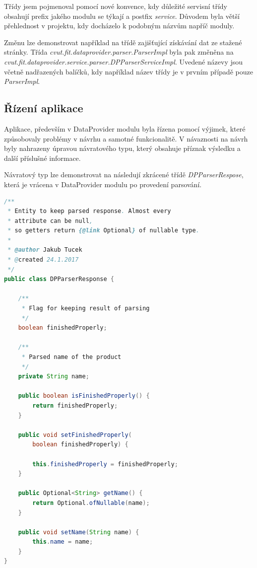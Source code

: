 \documentclass[thesis=B,czech]{FITthesis}[2012/06/26]
\begin{document}
Třídy jsem pojmenoval pomocí nové konvence, kdy důležité servisní třídy obsahují prefix jakého modulu se týkají
a postfix \textit{service}. Důvodem byla větší přehlednost v projektu, kdy docházelo k podobným názvům napříč moduly.
\par
Změnu lze demonstrovat například na třídě zajišťující získávání dat ze stažené stránky. Třída \textit{cvut.fit.dataprovider.parser.ParserImpl} byla pak změněna na \textit{cvut.fit.dataprovider.service.parser.DPParserServiceImpl}. Uvedené názevy jsou včetně 
nadřazených balíčků, kdy například název třídy je v prvním případě pouze \textit{ParserImpl}.

\subsection{Řízení aplikace}
Aplikace, především v DataProvider modulu byla řízena pomocí výjimek, které způsobovaly problémy v návrhu a samotné funkcionalitě.
V návaznosti na návrh byly nahrazeny úpravou návratového typu, který obsahuje příznak výsledku 
a další příslušné informace.
\par
Návratový typ lze demonstrovat na následují zkrácené třídě \textit{DPParserRespose}, která je vrácena v DataProvider modulu
po provedení parsování.

\begin{lstlisting}[language=Java]
/**
 * Entity to keep parsed response. Almost every 
 * attribute can be null, 
 * so getters return {@link Optional} of nullable type.
 *
 * @author Jakub Tucek
 * @created 24.1.2017
 */
public class DPParserResponse {

    /**
     * Flag for keeping result of parsing
     */
    boolean finishedProperly;

    /**
     * Parsed name of the product
     */
    private String name;

    public boolean isFinishedProperly() {
        return finishedProperly;
    }

    public void setFinishedProperly(
    	boolean finishedProperly) {
    	
        this.finishedProperly = finishedProperly;
    }

    public Optional<String> getName() {
        return Optional.ofNullable(name);
    }

    public void setName(String name) {
        this.name = name;
    }
}
\end{lstlisting}
\end{document}
